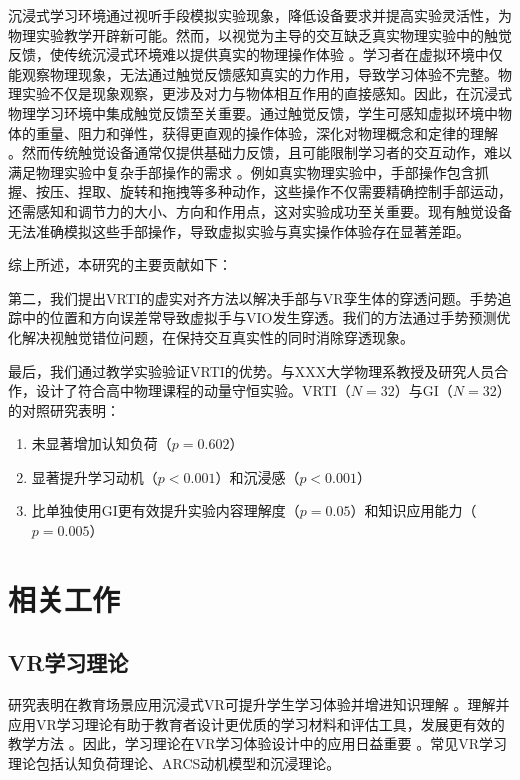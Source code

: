 \documentclass[runningheads]{llncs}
\begin{document}
沉浸式学习环境通过视听手段模拟实验现象，降低设备要求并提高实验灵活性，为物理实验教学开辟新可能。然而，以视觉为主导的交互缺乏真实物理实验中的触觉反馈，使传统沉浸式环境难以提供真实的物理操作体验 \cite{giri2021application}。学习者在虚拟环境中仅能观察物理现象，无法通过触觉反馈感知真实的力作用，导致学习体验不完整。物理实验不仅是现象观察，更涉及对力与物体相互作用的直接感知。因此，在沉浸式物理学习环境中集成触觉反馈至关重要。通过触觉反馈，学生可感知虚拟环境中物体的重量、阻力和弹性，获得更直观的操作体验，深化对物理概念和定律的理解 \cite{minaker2016handson}。然而传统触觉设备通常仅提供基础力反馈，且可能限制学习者的交互动作，难以满足物理实验中复杂手部操作的需求 \cite{bonfert2023challenges}。例如真实物理实验中，手部操作包含抓握、按压、捏取、旋转和拖拽等多种动作，这些操作不仅需要精确控制手部运动，还需感知和调节力的大小、方向和作用点，这对实验成功至关重要。现有触觉设备无法准确模拟这些手部操作，导致虚拟实验与真实操作体验存在显著差距。

综上所述，本研究的主要贡献如下：


第二，我们提出VRTI的虚实对齐方法以解决手部与VR孪生体的穿透问题。手势追踪中的位置和方向误差常导致虚拟手与VIO发生穿透。我们的方法通过手势预测优化解决视触觉错位问题，在保持交互真实性的同时消除穿透现象。

最后，我们通过教学实验验证VRTI的优势。与XXX大学物理系教授及研究人员合作，设计了符合高中物理课程的动量守恒实验。VRTI（$N=32$）与GI（$N=32$）的对照研究表明：
\begin{enumerate}
  \item 未显著增加认知负荷（$p = 0.602$）
  \item 显著提升学习动机（$p < 0.001$）和沉浸感（$p < 0.001$）
  \item 比单独使用GI更有效提升实验内容理解度（$p = 0.05$）和知识应用能力（$p = 0.005$）
\end{enumerate}

\section{相关工作}
\subsection{VR学习理论}
研究表明在教育场景应用沉浸式VR可提升学生学习体验并增进知识理解 \cite{freina2015literature}。理解并应用VR学习理论有助于教育者设计更优质的学习材料和评估工具，发展更有效的教学方法 \cite{matovu2023immersive}。因此，学习理论在VR学习体验设计中的应用日益重要 \cite{marougkas2023virtual}。常见VR学习理论包括认知负荷理论、ARCS动机模型和沉浸理论。
\end{document}
